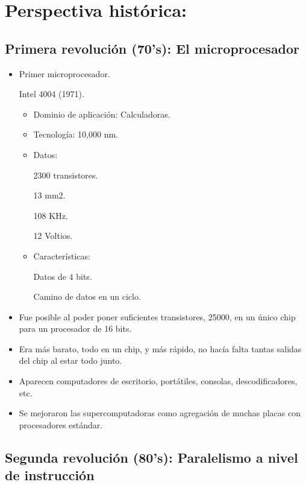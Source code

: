 \documentclass[12pt, twoside, openright]{report} %
\begin{document}
\section{Perspectiva histórica:}

\subsection{Primera revolución (70's): El microprocesador}

\begin{itemize}
	\item Primer microprocesador.

	      Intel 4004 (1971).
	      \begin{itemize}
		      \item Dominio de aplicación: Calculadoras.
		      \item Tecnología: 10,000 nm.
		      \item Datos:

		            2300 transistores.

		            13 mm2.

		            108 KHz.

		            12 Voltios.

		      \item Características:

		            Datos de 4 bits.

		            Camino de datos en un ciclo.

	      \end{itemize}

	\item Fue posible al poder poner suficientes transistores, 25000, en un
	      único chip para un procesador de 16 bits.
	\item Era más barato, todo en un chip, y más rápido, no hacía falta
	      tantas salidas del chip al estar todo junto.
	\item Aparecen computadores de escritorio, portátiles, consolas,
	      descodificadores, etc.
	\item Se mejoraron las supercomputadoras como agregación de muchas
	      placas con procesadores estándar.
\end{itemize}
\pagebreak
\subsection{Segunda revolución (80's): Paralelismo a nivel de instrucción}
\end{document}
